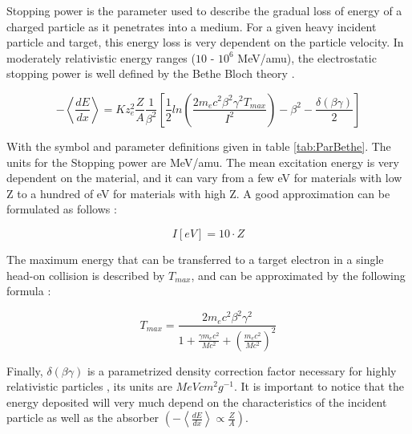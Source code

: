 Stopping power is the parameter used to describe the gradual loss of energy of a charged particle as it penetrates into a medium. For a given heavy incident particle and target, this energy loss is very dependent on the particle velocity. In moderately relativistic energy ranges ($10$ - $10^6$ \si[]{\mega \electronvolt}/amu), the electrostatic stopping power is well defined by the Bethe Bloch theory \parencite[]{ref:Bethe}. 

\begin{equation}
    - \left< \frac{dE}{dx} \right> = Kz^2_e\frac{Z}{A}\frac{1}{\beta^2}\left[ \frac{1}{2} ln \left( \frac{2m_e c^2 \beta^2 \gamma^2 T_{max}}{I^2}\right) -\beta^2 - \frac{\delta\left(\beta \gamma\right)}{2} \right]
    \label{eq:bethe}
\end{equation}

With the symbol and parameter definitions given in table \ref{tab:ParBethe}. The units for the Stopping power are \si[]{\mega \electronvolt}/amu. The mean excitation energy is very dependent on the material, and it can vary from a few \si[]{\electronvolt} for materials with low Z to a hundred of \si[]{\electronvolt} for materials with high Z. A good approximation can be formulated as follows \parencite*[][]{ref:IonizationEne}:

\begin{equation}
    I \left[ eV \right] = 10 \cdot Z 
    \label{eq:ionizationEnergy}
\end{equation}

The maximum energy that can be transferred to a target electron in a single head-on collision is described by $T_{max}$, and can be approximated by the following formula \parencite*[][]{ref:TmaxFormula}: 

\begin{equation}
    T_{max} = \frac{2m_e c^2 \beta^2 \gamma^2}{1+\frac{\gamma m_e c^2}{M c^2}+\left( \frac{m_e c^2}{M c^2} \right)^2}
    \label{eq:tmax}
\end{equation}

Finally, $\delta (\beta \gamma)$ is a parametrized density correction factor necessary for highly relativistic particles \parencite*[][]{ref:Bethe}, its units are $MeV cm^2 g^{-1}$. It is important to notice that the energy deposited will very much depend on the characteristics of the incident particle as well as the absorber $\left( -\left< \frac{dE}{dx} \right> \propto \frac{Z}{A}  \right)$. 

